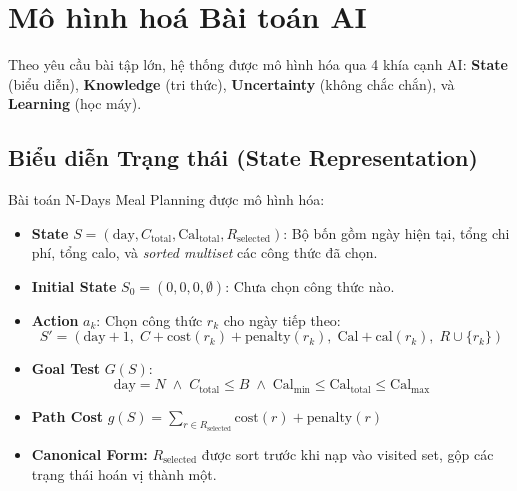 
\section{Mô hình hoá Bài toán AI}
\label{sec:model}

Theo yêu cầu bài tập lớn, hệ thống được mô hình hóa qua 4 khía cạnh AI: \textbf{State} (biểu diễn), \textbf{Knowledge} (tri thức), \textbf{Uncertainty} (không chắc chắn), và \textbf{Learning} (học máy).

\subsection{Biểu diễn Trạng thái (State Representation)}

Bài toán N-Days Meal Planning được mô hình hóa:

\begin{itemize}
  \item \textbf{State} $S = (\text{day}, C_{\text{total}}, \text{Cal}_{\text{total}}, R_{\text{selected}})$: Bộ bốn gồm ngày hiện tại, tổng chi phí, tổng calo, và \textit{sorted multiset} các công thức đã chọn.

  \item \textbf{Initial State} $S_0 = (0, 0, 0, \emptyset)$: Chưa chọn công thức nào.

  \item \textbf{Action} $a_k$: Chọn công thức $r_k$ cho ngày tiếp theo:
  \begin{equation}
    S' = (\text{day}+1,\; C + \text{cost}(r_k) + \text{penalty}(r_k),\; \text{Cal} + \text{cal}(r_k),\; R \cup \{r_k\})
  \end{equation}

  \item \textbf{Goal Test} $G(S)$:
  \begin{equation}
    \text{day} = N \;\wedge\; C_{\text{total}} \leq B \;\wedge\; \text{Cal}_{\min} \leq \text{Cal}_{\text{total}} \leq \text{Cal}_{\max}
  \end{equation}

  \item \textbf{Path Cost} $g(S) = \sum_{r \in R_{\text{selected}}} \text{cost}(r) + \text{penalty}(r)$

  \item \textbf{Canonical Form:} $R_{\text{selected}}$ được sort trước khi nạp vào visited set, gộp các trạng thái hoán vị thành một.
\end{itemize}

